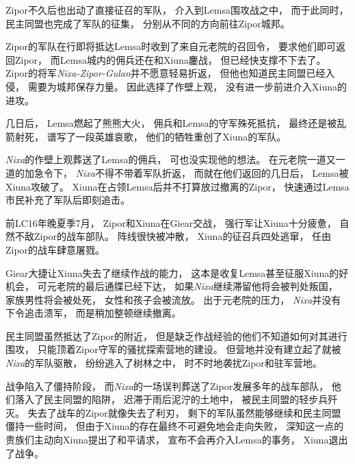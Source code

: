 \documentclass[UTF8,12pt]{ctexbook}
\begin{document}
            Zipor不久后也出动了直接征召的军队，
            介入到Lemsa围攻战之中，
            而于此同时，
            民主同盟也完成了军队的征集，
            分别从不同的方向前往Zipor城邦。

            Zipor的军队在行即将抵达Lemsa时收到了来自元老院的召回令，
            要求他们即可返回Zipor，
            而Lemsa城内的佣兵还在和Xiuna鏖战，
            但已经快支撑不下去了。
            Zipor的将军\emph{Nixa-Zipor-Gulan}并不愿意轻易折返，
            但他也知道民主同盟已经入侵，
            需要为城邦保存力量。
            因此选择了作壁上观，
            没有进一步前进介入Xiuna的进攻。

            几日后，
            Lemsa燃起了熊熊大火，
            佣兵和Lemsa的守军殊死抵抗，
            最终还是被乱箭射死，
            谱写了一段英雄哀歌，
            他们的牺牲重创了Xiuna的军队。

            \emph{Nixa}的作壁上观葬送了Lemsa的佣兵，
            可也没实现他的想法。
            在元老院一道又一道的加急令下，
            \emph{Nixa}不得不带着军队折返，
            而就在他们返回的几日后，
            Lemsa被Xiuna攻破了。
            Xiuna在占领Lemsa后并不打算放过撤离的Zipor，
            快速通过Lemsa市民补充了军队后即刻追击。

            前LC16年晚夏季7月，
            Zipor和Xiuna在Giear交战，
            强行军让Xiuna十分疲惫，
            自然不敌Zipor的战车部队。
            阵线很快被冲散，
            Xiuna的征召兵四处逃窜，
            任由Zipor的战车肆意屠戮。

            Giear大捷让Xiuna失去了继续作战的能力，
            这本是收复Lemsa甚至征服Xiuna的好机会，
            可元老院的最后通牒已经下达，
            如果\emph{Nixa}继续滞留他将会被判处叛国，
            家族男性将会被处死，
            女性和孩子会被流放。
            出于元老院的压力，
            \emph{Nixa}并没有下令追击溃军，
            而是稍加整顿继续撤离。

            民主同盟虽然抵达了Zipor的附近，
            但是缺乏作战经验的他们不知道如何对其进行围攻，
            只能顶着Zipor守军的骚扰探索营地的建设。
            但营地并没有建立起了就被\emph{Nixa}的军队驱散，
            纷纷逃入了树林之中，
            时不时地袭扰Zipor和驻军营地。

            战争陷入了僵持阶段，
            而\emph{Nixa}的一场误判葬送了Zipor发展多年的战车部队，
            他们落入了民主同盟的陷阱，
            迟滞于雨后泥泞的土地中，
            被民主同盟的轻步兵歼灭。
            失去了战车的Zipor就像失去了利刃，
            剩下的军队虽然能够继续和民主同盟僵持一些时间，
            但由于Xiuna的存在最终不可避免地会走向失败，
            深知这一点的贵族们主动向Xiuna提出了和平请求，
            宣布不会再介入Lemsa的事务，
            Xiuna退出了战争。
\end{document}
